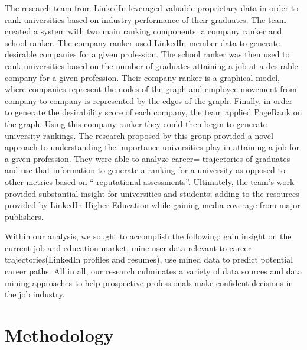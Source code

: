 The research team from LinkedIn \cite{kapur2016} leveraged valuable proprietary data in order to rank universities based on industry performance of their graduates. The team created a system with two main ranking components: a company ranker and school ranker. The company ranker used LinkedIn member data to generate desirable companies for a given profession. The school ranker was then used to rank universities based on the number of graduates attaining a job at a desirable company for a given profession. Their company ranker is a graphical model, where companies represent the nodes of the graph and employee movement from company to company is represented by the edges of the graph. Finally, in order to generate the desirability score of each company, the team applied PageRank on the graph. Using this company ranker they could then begin to generate university rankings. The research proposed by this group provided a novel approach to understanding the importance universities play in attaining a job for a given profession. They were able to analyze career= trajectories of graduates and use that information to generate a ranking for a university as opposed to other metrics based on “ reputational assessments”. Ultimately, the team’s work provided substantial insight for universities and students; adding to the resources provided by LinkedIn Higher Education while gaining media coverage from major publishers.

Within our analysis, we sought to accomplish the following: gain insight on the current job and education market, mine user data relevant to career trajectories(LinkedIn profiles and resumes), use mined data to predict potential career paths. All in all, our research culminates a variety of data sources and data mining approaches to help prospective professionals make confident decisions in the job industry. 
\section{Methodology}
